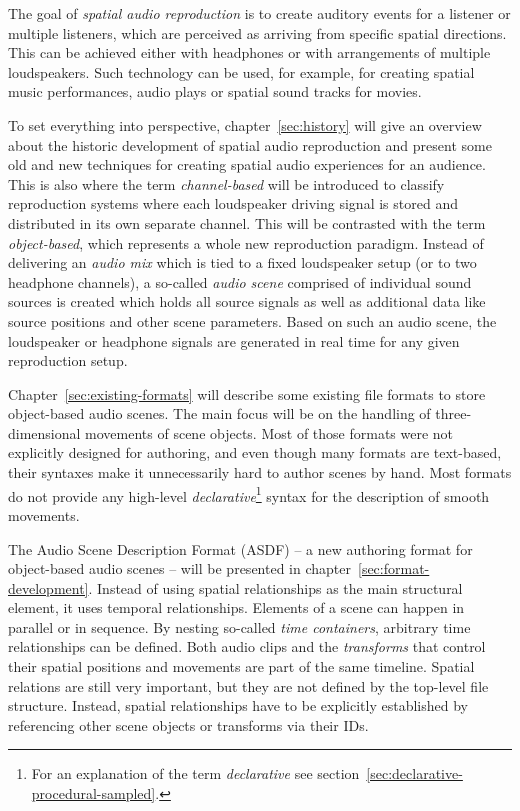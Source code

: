 \renewcommand{\dictumwidth}{0.5\textwidth}


The goal of \emph{spatial audio reproduction}
is to create auditory events for a listener or multiple listeners,
which are perceived as arriving from specific spatial directions.
This can be achieved either with headphones or with arrangements
of multiple loudspeakers.
Such technology can be used,
for example,
for creating
spatial music performances,
audio plays
or spatial sound tracks for movies.

To set everything into perspective, chapter~\ref{sec:history}
will give an overview about the historic development of spatial audio
reproduction and present some old and new techniques
for creating spatial audio experiences for an audience.
This is also where the term \emph{channel-based} will be introduced
to classify reproduction systems
where each loudspeaker driving signal
is stored and distributed in its own separate channel.
This will be contrasted with
the term \emph{object-based},
which represents a whole new reproduction paradigm.
Instead of delivering an \emph{audio mix} which is tied to a fixed loudspeaker
setup (or to two headphone channels),
a so-called \emph{audio scene} comprised of individual sound sources is
created which holds all source signals as well as additional data like source
positions and other scene parameters.
Based on such an audio scene,
the loudspeaker or headphone signals are generated in real time
for any given reproduction setup.

Chapter~\ref{sec:existing-formats}
will describe some existing file formats to store object-based
audio scenes.
The main focus will be on the handling of three-dimensional movements
of scene objects.
Most of those formats were not explicitly designed for authoring,
and even though many formats are text-based,
their syntaxes make it unnecessarily hard to author scenes by hand.
Most formats do not provide any
high-level \emph{declarative}\footnote{%
For an explanation of the term \emph{declarative} see
section~\ref{sec:declarative-procedural-sampled}.}
syntax for the description of smooth movements.

The Audio Scene Description Format (ASDF)
-- a new authoring format for object-based audio scenes --
will be presented in chapter~\ref{sec:format-development}.
Instead of using spatial relationships as the main structural element,
it uses temporal relationships.
Elements of a scene can happen in parallel or in sequence.
By nesting so-called \emph{time containers},
arbitrary time relationships can be defined.
Both audio clips and the \emph{transforms} that control their spatial
positions and movements
are part of the same timeline.
Spatial relations are still very important,
but they are not defined by the top-level file structure.
Instead, spatial relationships have to be explicitly established
by referencing other scene objects or transforms via their IDs.

